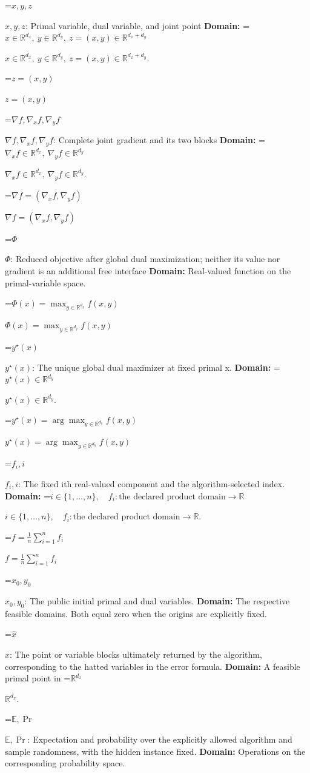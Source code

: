 \documentclass[10pt,a4paper]{article}
\newcommand{\AtlasMath}[1]{\par\begingroup\centering\setbox0=\hbox{$\displaystyle #1$}\ifdim\wd0>1.4\linewidth\typeout{ATLAS WIDE FORMULA: \the\wd0}\fi\ifdim\wd0>\linewidth\resizebox{\linewidth}{!}{\box0}\else\box0\fi\par\endgroup}
\newcommand{\AtlasInlineMath}[1]{\begingroup\setbox0=\hbox{$#1$}\ifdim\wd0>.4\linewidth\endgroup\AtlasMath{#1}\else\endgroup$#1$\fi}
\begin{document}
\AtlasInlineMath{x,y,z}: Primal variable, dual variable, and joint point \textbf{Domain:} \AtlasInlineMath{x\in\mathbb R^{d_x},\ y\in\mathbb R^{d_y},\ z=(x,y)\in\mathbb R^{d_x+d_y}}.



\AtlasInlineMath{z=(x,y)}



\AtlasInlineMath{\nabla f,\nabla_x f,\nabla_y f}: Complete joint gradient and its two blocks \textbf{Domain:} \AtlasInlineMath{\nabla_x f\in\mathbb R^{d_x},\ \nabla_y f\in\mathbb R^{d_y}}.



\AtlasInlineMath{\nabla f=(\nabla_x f,\nabla_y f)}



\AtlasInlineMath{\Phi}: Reduced objective after global dual maximization; neither its value nor gradient is an additional free interface \textbf{Domain:} Real-valued function on the primal-variable space.



\AtlasInlineMath{\Phi(x)=\max_{y\in \mathbb R^{d_y}}f(x,y)}



\AtlasInlineMath{y^\star(x)}: The unique global dual maximizer at fixed primal x. \textbf{Domain:} \AtlasInlineMath{y^\star(x)\in\mathbb R^{d_y}}.



\AtlasInlineMath{y^\star(x)=\arg\max_{y\in\mathbb R^{d_y}}f(x,y)}



\AtlasInlineMath{f_i,i}: The fixed ith real-valued component and the algorithm-selected index. \textbf{Domain:} \AtlasInlineMath{i\in\{1,\ldots,n\},\quad f_i:\text{the declared product domain}\to\mathbb R}.



\AtlasInlineMath{f=\frac1n\sum_{i=1}^n f_i}



\AtlasInlineMath{x_0,y_0}: The public initial primal and dual variables. \textbf{Domain:} The respective feasible domains. Both equal zero when the origins are explicitly fixed.



\AtlasInlineMath{\widehat x}: The point or variable blocks ultimately returned by the algorithm, corresponding to the hatted variables in the error formula. \textbf{Domain:} A feasible primal point in \AtlasInlineMath{\mathbb R^{d_x}}.



\AtlasInlineMath{\mathbb E,\Pr}: Expectation and probability over the explicitly allowed algorithm and sample randomness, with the hidden instance fixed. \textbf{Domain:} Operations on the corresponding probability space.
\end{document}
